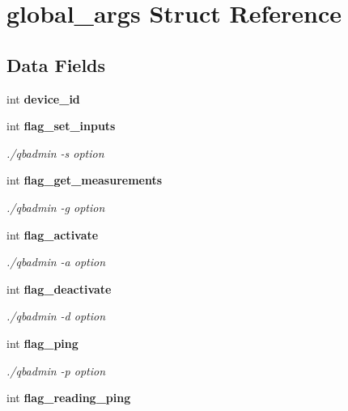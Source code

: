 \section{global\+\_\+args Struct Reference}
\label{structglobal__args}
\subsection*{Data Fields}
\begin{DoxyCompactItemize}
\item 
\mbox{\label{structglobal__args_accfd0301c469314772cc651ec198d492}} 
int {\bfseries device\+\_\+id}
\item 
\mbox{\label{structglobal__args_a8c2bd6bbe7e544186ac9dafe368eda0a}} 
int \textbf{ flag\+\_\+set\+\_\+inputs}
\begin{DoxyCompactList}\small\item\em ./qbadmin -\/s option \end{DoxyCompactList}\item 
\mbox{\label{structglobal__args_ae6be84e61dfa72e2992e18b2ff872d37}} 
int \textbf{ flag\+\_\+get\+\_\+measurements}
\begin{DoxyCompactList}\small\item\em ./qbadmin -\/g option \end{DoxyCompactList}\item 
\mbox{\label{structglobal__args_a357acdae444e13e67d3747246a2a6537}} 
int \textbf{ flag\+\_\+activate}
\begin{DoxyCompactList}\small\item\em ./qbadmin -\/a option \end{DoxyCompactList}\item 
\mbox{\label{structglobal__args_a3f8a32491b8271e7dcf9645888fd5d90}} 
int \textbf{ flag\+\_\+deactivate}
\begin{DoxyCompactList}\small\item\em ./qbadmin -\/d option \end{DoxyCompactList}\item 
\mbox{\label{structglobal__args_a666e67d4cbdc4b0c0ceaebc7f0d7e4ae}} 
int \textbf{ flag\+\_\+ping}
\begin{DoxyCompactList}\small\item\em ./qbadmin -\/p option \end{DoxyCompactList}\item 
\mbox{\label{structglobal__args_acaaec624a9aab15fb3b771a424ac5d7e}} 
int \textbf{ flag\+\_\+reading\+\_\+ping}

\end{DoxyCompactItemize}
